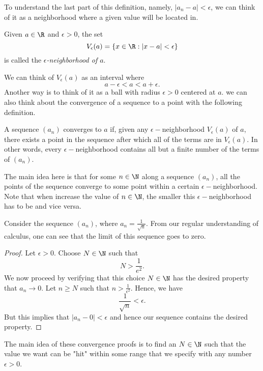 To understand the last part of this definition, namely, \( |a_n - a| < \epsilon \), we can think of it as a neighborhood where a given value will be located in. 
\begin{tcolorbox}
\begin{defn}
Given \( a \in \R \) and \( \epsilon  > 0 \), the set 
\[ V_{  \epsilon }(a) = \{ x \in \R : |x-a| < \epsilon  \}\]
is called the \textit{\( \epsilon \)-neighborhood of \( a \)}. 
\end{defn}
\end{tcolorbox}
We can think of \( V_{ \epsilon }(a)\) as an interval where 
\[ a - \epsilon < a < a + \epsilon.\]
Another way is to think of it as a ball with radius \( \epsilon > 0\) centered at \( a \). 
we can also think about the convergence of a sequence to a point with the following definition.
\begin{tcolorbox}
\begin{defn}
    A sequence \( (a_n) \) converges to \( a \) if, given any \( \epsilon-\)neighborhood \( V_{ \epsilon } (a)\) of \( a \), there exists a point in the sequence after which all of the terms are in \( V_{ \epsilon } (a) \). In other words, every \( \epsilon - \)neighborhood contains all but a finite number of the terms of \( (a_n) \). 
\end{defn}
\end{tcolorbox}

The main idea here is that for some \( n \in \N \) along a sequence \( (a_n) \), all the points of the sequence converge to some point within a certain \( \epsilon -\)neighborhood. Note that when increase the value of \( n \in \N \), the smaller this \( \epsilon-\)neighborhood has to be and vice versa.

\begin{ex}
Consider the sequence \( (a_n) \), where \( a_n = \frac{1}{ \sqrt{n} }\). From our regular understanding of calculus, one can see that the limit of this sequence goes to zero. 

\begin{proof}
Let \( \epsilon  > 0 \). Choose \( N \in \N \) such that 
\[ N > \frac{1}{e^2}.\]
We now proceed by verifying that this choice \( N \in \N \) has the desired property that \( a_n \to 0 \). Let \( n \geq N \) such that \( n > \frac{1}{ \epsilon^2} \). Hence, we have 
\[ \frac{1}{ \sqrt{n}} < \epsilon. \]
But this implies that \( |a_n - 0| < \epsilon \) and hence our sequence contains the desired property. 
\end{proof}
\end{ex}
The main idea of these convergence proofs is to find an \( N \in \N \) such that the value we want can be "hit" within some range that we specify with any number \( \epsilon > 0   \).


